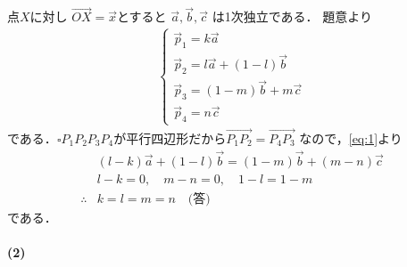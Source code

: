 \documentclass[../../main.tex]{subfiles}
\begin{document}
点$X$に対し $\overrightarrow{OX} = \vec{x}$とすると
$\vec{a}, \vec{b}, \vec{c}$ は1次独立である．
題意より
\begin{align}
  \begin{cases}
    \vec{p}_1 = k\vec{a} \\
    \vec{p}_2 = l\vec{a} + (1-l)\vec{b} \\
    \vec{p}_3 = (1-m)\vec{b} + m\vec{c} \\
    \vec{p}_4 = n\vec{c}
  \end{cases} \label{eq:1}
\end{align}
である．$\square P_1P_2P_3P_4$が平行四辺形だから$\overrightarrow{P_1P_2} = \overrightarrow{P_4P_3}$ なので，\cref{eq:1}より
\begin{align}
  & (l-k)\vec{a} + (1-l)\vec{b} = (1-m)\vec{b} + (m-n)\vec{c} \\
  & l-k=0, \quad m-n=0, \quad 1-l=1-m \\
  \therefore
  & k = l = m = n \quad \text{(答)}
\end{align}
である．

\paragraph{(2)}
\end{document}
